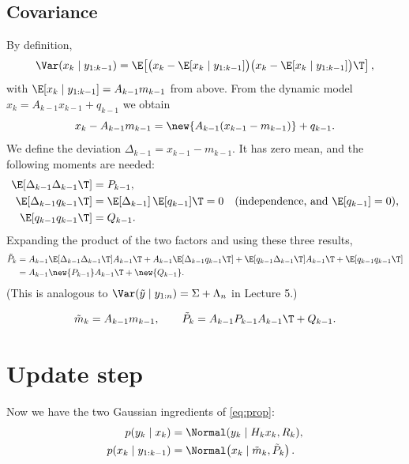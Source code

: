 \subsection{Covariance}
By definition,
\begin{equation}
  \Var(x_k \mid y_{1:k-1}) = \E\!\left[\big(x_k - \E[x_k \mid y_{1:k-1}]\big)\big(x_k - \E[x_k \mid y_{1:k-1}]\big)\T\right],
\end{equation}
with $\E[x_k \mid y_{1:k-1}] = A_{k-1}m_{k-1}$ from above. From the dynamic model $x_k = A_{k-1}x_{k-1} + q_{k-1}$ we obtain
\begin{equation}
  x_k - A_{k-1}m_{k-1} = \new{A_{k-1}(x_{k-1} - m_{k-1})} + q_{k-1}.
\end{equation}
We define the deviation $\Delta_{k-1} = x_{k-1} - m_{k-1}$. It has zero mean, and the following moments are needed:
\begin{align}
  \E\!\left[\Delta_{k-1}\Delta_{k-1}\T\right] &= P_{k-1}, \\
  \E\!\left[\Delta_{k-1}q_{k-1}\T\right] &= \E[\Delta_{k-1}]\,\E[q_{k-1}]\T = 0 \quad\text{(independence, and } \E[q_{k-1}]=0\text{)}, \\
  \E\!\left[q_{k-1}q_{k-1}\T\right] &= Q_{k-1}.
\end{align}
Expanding the product of the two factors and using these three results,
\begin{equation}
  \begin{aligned}
  \Pt_k &= A_{k-1}\E[\Delta_{k-1}\Delta_{k-1}\T]A_{k-1}\T + A_{k-1}\E[\Delta_{k-1}q_{k-1}\T] + \E[q_{k-1}\Delta_{k-1}\T]A_{k-1}\T + \E[q_{k-1}q_{k-1}\T] \\
  &= A_{k-1}\new{P_{k-1}}A_{k-1}\T + \new{Q_{k-1}}.
  \end{aligned}
\end{equation}
(This is analogous to $\Var(\tilde y \mid y_{1:n}) = \Sigma + \Lambda_n$ in Lecture 5.)

\begin{equation}
  \mt_k = A_{k-1}m_{k-1}, \qquad \Pt_k = A_{k-1}P_{k-1}A_{k-1}\T + Q_{k-1}.
\end{equation}

\section{Update step}
Now we have the two Gaussian ingredients of \eqref{eq:prop}:
\begin{align}
  p(y_k \mid x_k) &= \Normal(y_k \mid H_k x_k, R_k), \\
  p(x_k \mid y_{1:k-1}) &= \Normal\!\left(x_k \mid \mt_k, \Pt_k\right).
\end{align}

